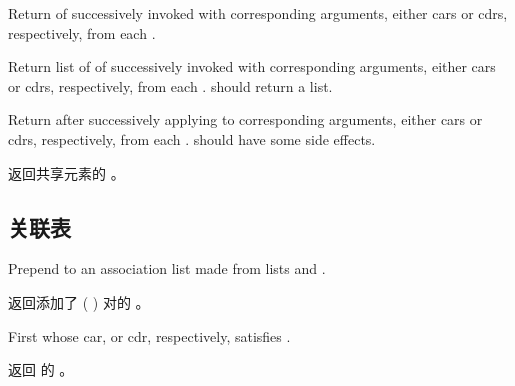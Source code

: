 \begin{LIST}{1cm}
  {
    Return  of 
    successively invoked with corresponding arguments, either cars or
    cdrs, respectively, from each .
  }

  {
    Return list of  of
     successively invoked with corresponding arguments,
    either cars or cdrs, respectively, from each
    .  should return a list.
  }

  {
    Return  after successively applying
     to corresponding arguments, either cars or cdrs,
    respectively, from each .  should have
    some side effects.
  }

  {
    返回共享元素的  。
  }

\end{LIST}


\subsection{关联表} 
\label{section:关联表}
\begin{LIST}{1cm}

  {
    Prepend to  an association list made from
    lists  and .
  }

  {
    返回添加了 (  ) 对的
    。
  }

  {%
    First  whose car, or cdr, respectively, satisfies
    .
  }

  {
    返回  的 。
  }

\end{LIST}


